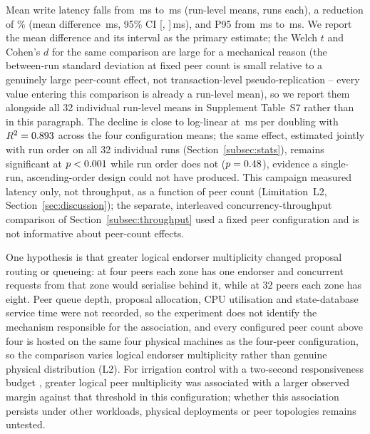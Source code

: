 \documentclass[a4paper,fleqn]{cas-sc}
\begin{document}
Mean write latency falls from \ScaleMinPeerMean\,ms to \ScaleMaxPeerMean\,ms
(run-level means, \PartRunsPerConfig{} runs each), a reduction of
\ScaleLatencyDropPct\% (mean difference \ScaleDiffMs\,ms, 95\% CI
[\ScaleDiffCILow, \ScaleDiffCIHigh]\,ms), and P95 from
\ScaleMinPeerPNinetyFive\,ms to \ScaleMaxPeerPNinetyFive\,ms. We report the
mean difference and its interval as the primary estimate; the Welch $t$
and Cohen's $d$ for the same comparison are large for a mechanical reason
(the between-run standard deviation at fixed peer count is small relative
to a genuinely large peer-count effect, not transaction-level
pseudo-replication -- every value entering this comparison is already a
run-level mean), so we report them alongside all 32 individual run-level
means in Supplement Table~S7 rather than in this paragraph. The decline is
close to
log-linear at \ScaleSlope\,ms per doubling with $R^2 = 0.893$
across the four configuration means; the same effect, estimated jointly
with run order on all 32 individual runs (Section~\ref{subsec:stats}),
remains significant at $p<0.001$ while run order does not
($p=0.48$), evidence a single-run, ascending-order design
could not have produced. This campaign measured latency only, not
throughput, as a function of peer count (Limitation~L2,
Section~\ref{sec:discussion}); the separate, interleaved
concurrency-throughput comparison of Section~\ref{subsec:throughput} used
a fixed peer configuration and is not informative about peer-count
effects.

One hypothesis is that greater logical endorser multiplicity changed
proposal routing or queueing: at four peers each zone has one endorser and
concurrent requests from that zone would serialise behind it, while at 32
peers each zone has eight. Peer queue depth, proposal allocation, CPU
utilisation and state-database service time were not recorded, so the
experiment does not identify the mechanism responsible for the
association, and every configured peer count above four is hosted on the
same four physical machines as the four-peer configuration, so the
comparison varies logical endorser multiplicity rather than genuine
physical distribution (L2). For irrigation control with a two-second
responsiveness budget \cite{leacox2013wireless}, greater logical peer
multiplicity was associated with a larger observed margin against that
threshold in this configuration; whether this association persists under
other workloads, physical deployments or peer topologies remains
untested.
\end{document}
